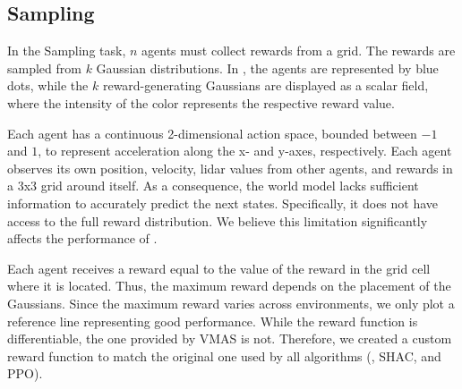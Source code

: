\subsection{Sampling}
In the Sampling task, $n$ agents must collect rewards from a grid. The rewards are sampled from $k$ Gaussian distributions. In , the agents are represented by blue dots, while the $k$ reward-generating Gaussians are displayed as a scalar field, where the intensity of the color represents the respective reward value.

Each agent has a continuous 2-dimensional action space, bounded between $-1$ and $1$, to represent acceleration along the x- and y-axes, respectively. Each agent observes its own position, velocity, lidar values from other agents, and rewards in a 3x3 grid around itself. As a consequence, the world model lacks sufficient information to accurately predict the next states. Specifically, it does not have access to the full reward distribution. We believe this limitation significantly affects the performance of \fname{}.

Each agent receives a reward equal to the value of the reward in the grid cell where it is located. Thus, the maximum reward depends on the placement of the Gaussians. Since the maximum reward varies across environments, we only plot a reference line representing good performance. While the reward function is differentiable, the one provided by VMAS is not. Therefore, we created a custom reward function to match the original one used by all algorithms (\fname{}, SHAC, and PPO).



